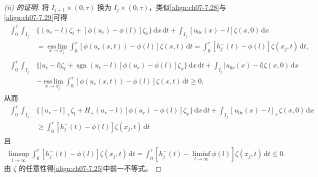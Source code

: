 \documentclass[../../main.tex]{subfiles}%
\begin{document}
\begin{proof}[(ii) 的证明]
将 $I_{j+1}\times(0,\tau)$ 换为 $I_j\times(0,\tau)$，类似\eqref{align:ch07-7.28}与\eqref{align:ch07-7.29}可得
\begin{align}
\begin{aligned}
\int_0^\tau\int_{I_j}&\{(u_r-l)\zeta_t+[\phi(u_r)-\phi(l)]\zeta_x\}\,\mathrm{d}x\,\mathrm{d}t
+\int_{I_j}[u_{0r}(x)-l]\zeta(x,0)\,\mathrm{d}x\\
&=\operatorname*{ess\,lim}_{x\to x_j^-}\int_0^\tau[\phi(u_r(x,t))-\phi(l)]\zeta(x,t)\,\mathrm{d}t
=\int_0^\tau[h_j^-(t)-\phi(l)]\zeta(x_j,t)\,\mathrm{d}t,
\end{aligned} 
\label{align:ch07-7.30}
\end{align}
\begin{align}
\begin{aligned}
\int_0^\tau\int_{I_j}&\{|u_r-l|\zeta_t+\operatorname{sgn}(u_r-l)[\phi(u_r)-\phi(l)]\zeta_x\}\,\mathrm{d}x\,\mathrm{d}t
+\int_{I_j}|u_{0r}(x)-l|\zeta(x,0)\,\mathrm{d}x\\
&-\operatorname*{ess\,lim}_{x\to x_j^-}\int_0^\tau[\phi(u_r(x,t))-\phi(l)]\zeta(x,t)\,\mathrm{d}t\geqslant0,
\end{aligned} 
\label{align:ch07-7.31}
\end{align}
从而
\begin{align*}
\begin{aligned}
\int_0^\tau\int_{I_j}&\{[u_r-l]_+\zeta_t+H_+(u_r-l)[\phi(u_r)-\phi(l)]\zeta_x\}\,\mathrm{d}x\,\mathrm{d}t
+\int_{I_j}[u_{0r}(x)-l]_+\zeta(x,0)\,\mathrm{d}x\\
&\geqslant\int_0^\tau[h_j^-(t)-\phi(l)]\zeta(x_j,t)\,\mathrm{d}t
\end{aligned}
\end{align*}
且
\begin{align*}
\limsup_{l\to\infty}\int_0^\tau[h_j^-(t)-\phi(l)]\zeta(x_j,t)\,\mathrm{d}t
=\int_0^\tau\left[h_j^-(t)-\liminf_{l\to\infty}\phi(l)\right]\zeta(x_j,t)\,\mathrm{d}t\leqslant0.
\end{align*}
由 $\zeta$ 的任意性得\eqref{align:ch07-7.25}中前一不等式。
\end{proof}
\end{document}
